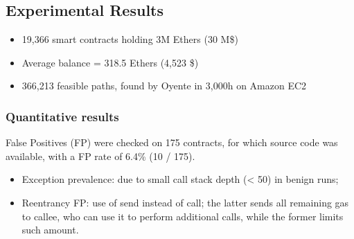 \documentclass[a4paper, 10pt, titlepage]{article}
\begin{document}
\subsection{Experimental Results}
\begin{itemize}
\item 19,366 smart contracts holding 3M Ethers (30 M\$)
\item Average balance = 318.5 Ethers (4,523 \$)
\item 366,213 feasible paths, found by Oyente in 3,000h on Amazon EC2
\end{itemize}

\subsubsection*{Quantitative results}
False Positives (FP) were checked on 175 contracts, for which source code was available, with a FP rate of 6.4\% (10 / 175).
\begin{itemize}
\item Exception prevalence: due to small call stack depth (< 50) in benign runs;
\item Reentrancy FP: use of send instead of call; the latter sends all remaining gas to callee, who can use it to perform additional calls, while the former limits such amount.
\end{itemize}
\end{document}
